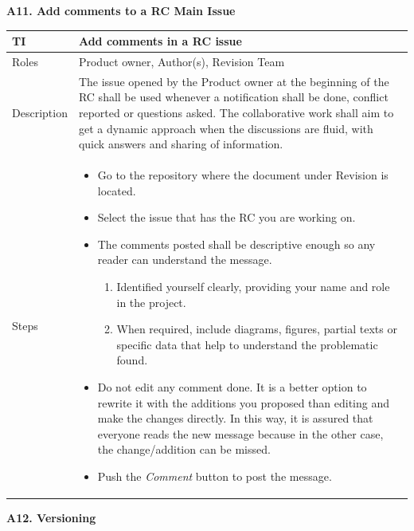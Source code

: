 \documentclass{template/openetcs_article}
\begin{document}
\textbf{A11. Add comments to a RC Main Issue}
\begin{flushleft}
\tablefirsthead{}
\tablehead{}
\tabletail{}
\tablelasttail{}
\begin{supertabular}{|m{2cm}|m{13cm}|}
\hline
{}
TI & 
Add comments in a RC issue
\\\hline
Roles &
Product owner, Author(s), Revision Team
\\\hline
Description &
The issue opened by the Product owner at the beginning of the RC shall be used whenever a notification shall be done, conflict reported or questions asked. The collaborative work shall aim to get a dynamic approach when the discussions are fluid, with quick answers and sharing of information.
\\\hline
Steps &
\begin{itemize}
\item Go to the repository where the document under Revision is located.
\item Select the issue that has the RC you are working on.
\item The comments posted shall be descriptive enough so any reader can understand the message. 
\begin{enumerate}
\item Identified yourself clearly, providing your name and role in the project.
\item When required, include diagrams, figures, partial texts or specific data that help to understand the problematic found.
\end{enumerate}
\item Do not edit any comment done. It is a better option to rewrite it with the additions you proposed than editing and make the changes directly. In this way, it is assured that everyone reads the new message because in the other case, the change/addition can be missed.
\item Push the {\it Comment} button to post the message.
\end{itemize}

\\\hline
\end{supertabular}
\end{flushleft}

\textbf{A12. Versioning}
\end{document}
